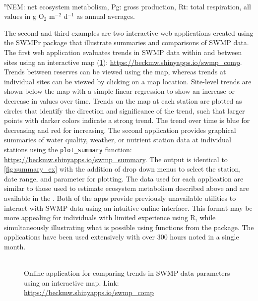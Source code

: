 \documentclass[10pt,letterpaper]{article}\usepackage[]{graphicx}\usepackage[]{color}
\begin{document}
\begin{table}[!tbp]
\footnotesize{\textsuperscript{a}NEM: net ecosystem metabolism, Pg: gross production, Rt: total respiration, all values in g O$_2$ m$^{-2}$ d$^{-1}$ as annual averages.}\end{table}


The second and third examples are two interactive web applications \cite{Chang15} created using the SWMPr package that illustrate summaries and comparisons of \gls{SWMP} data.  The first web application evaluates trends in \gls{SWMP} data within and between sites using an interactive map (\cref{fig:swmp_comp}): \href{https://beckmw.shinyapps.io/swmp_comp}{https://beckmw.shinyapps.io/swmp\_comp}.  Trends between reserves can be viewed using the map, whereas trends at individual sites can be viewed by clicking on a map location.  Site-level trends are shown below the map with a simple linear regression to show an increase or decrease in values over time.  Trends on the map at each station are plotted as circles that identify the direction and significance of the trend, such that larger points with darker colors indicate a strong trend.  The trend over time is blue for decreasing and red for increasing.  The second application provides graphical summaries of water quality, weather, or nutrient station data at individual stations using the \texttt{plot\_summary} function: \href{https://beckmw.shinyapps.io/swmp_summary/}{https://beckmw.shinyapps.io/swmp\_summary}.  The output is identical to \cref{fig:summary_ex} with the addition of drop down menus to select the station, date range, and parameter for plotting. The data used for each application are similar to those used to estimate ecosystem metabolism described above and are available in the .  Both of the apps provide previously unavailable utilities to interact with \gls{SWMP} data using an intuitive online interface.  This format may be more appealing for individuals with limited experience using R, while simultaneously illustrating what is possible using functions from the package. The applications have been used extensively with over 300 hours noted in a single month.   

\begin{figure}
\begin{center}
\includegraphics[width = 0\textwidth]{figure/swmp_comp.pdf}
\caption{Online application for comparing trends in \gls{SWMP} data parameters using an interactive map.  Link: \href{https://beckmw.shinyapps.io/swmp_comp}{https://beckmw.shinyapps.io/swmp\_comp}}
\label{fig:swmp_comp}
\end{center}
\end{figure}
\end{document}
